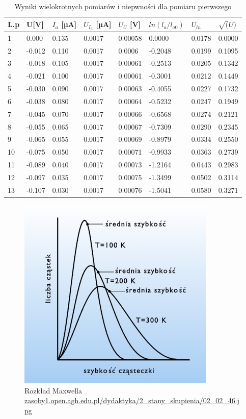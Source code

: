 \documentclass[a4paper]{article}
\newlength{\du}
\begin{document}
\begin{table}[h!]
\centering
 \begin{tabular}{ | l | l | l | l | l | l | l | l | }
 \hline
L.p & U[V] & $I_{a}$ [µA] & $U_{I_{a}}$ [µA] & $U_{U}$ [V] & $ln(l_{a}/l_{a0})$ & $U_{ln}$ & $\sqrt(U)$ \\ \hline
1 & 0.000 & 0.135 & 0.0017 & 0.00058 & 0.0000 & 0.0178 & 0.0000 \\ \hline
2 & -0.012 & 0.110 & 0.0017 & 0.0006 & -0.2048 & 0.0199 & 0.1095 \\ \hline
3 & -0.018 & 0.105 & 0.0017 & 0.00061 & -0.2513 & 0.0205 & 0.1342 \\ \hline
4 & -0.021 & 0.100 & 0.0017 & 0.00061 & -0.3001 & 0.0212 & 0.1449 \\ \hline
5 & -0.030 & 0.090 & 0.0017 & 0.00063 & -0.4055 & 0.0227 & 0.1732 \\ \hline
6 & -0.038 & 0.080 & 0.0017 & 0.00064 & -0.5232 & 0.0247 & 0.1949 \\ \hline
7 & -0.045 & 0.070 & 0.0017 & 0.00066 & -0.6568 & 0.0274 & 0.2121 \\ \hline
8 & -0.055 & 0.065 & 0.0017 & 0.00067 & -0.7309 & 0.0290 & 0.2345 \\ \hline
9 & -0.065 & 0.055 & 0.0017 & 0.00069 & -0.8979 & 0.0334 & 0.2550 \\ \hline
10 & -0.075 & 0.050 & 0.0017 & 0.00071 & -0.9933 & 0.0363 & 0.2739 \\ \hline
11 & -0.089 & 0.040 & 0.0017 & 0.00073 & -1.2164 & 0.0443 & 0.2983 \\ \hline
12 & -0.097 & 0.035 & 0.0017 & 0.00075 & -1.3499 & 0.0502 & 0.3114 \\ \hline
13 & -0.107 & 0.030 & 0.0017 & 0.00076 & -1.5041 & 0.0580 & 0.3271 \\ \hline
 \end{tabular}
\caption{Wyniki wielokrotnych pomiarów i niepwności dla pomiaru pierwszego}
\label{T1_pomiar}
\end{table}


\begin{figure}[h!]
\centering
\includegraphics[scale=0.5]{rozlad_maxwella.jpg}
\caption{Rozkład Maxwella \url{zasoby1.open.agh.edu.pl/dydaktyka/2_stany_skupienia/02_02_46.jpg}}
\end{figure}
\end{document}
